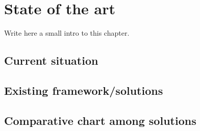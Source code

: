 \chapter{State of the art}
\label{chap:02soa}

Write here a small intro to this chapter.

\section{Current situation}

\section{Existing framework/solutions}

\section{Comparative chart among solutions}
